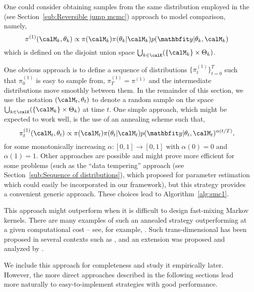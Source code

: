 One could consider obtaining samples from the same distribution employed in the \rjmcmc (see Section~\ref{sub:Reversible jump mcmc}) approach to model comparison, namely,
\begin{equation}
  \pi^{(1)}(\calM_k,\theta_k) \propto
  \pi(\calM_k)\pi(\theta_k|\calM_k)p(\data|\theta_k,\calM_k)
\end{equation}
which is defined on the disjoint union space
$\bigcup_{k\in\calK}(\{\calM_k\}\times\Theta_k)$.

One obvious \smc approach is to define a sequence of distributions $\{\pi_t^{(1)}\}_{t=0}^T$ such that $\pi^{(1)}_0$ is easy to sample from, $\pi_{T}^{(1)} = \pi^{(1)}$ and the intermediate distributions move smoothly between them. In the remainder of this section, we use the notation $(\calM_t,\theta_t)$ to denote a random sample on the space $\bigcup_{k\in\calK}(\{\calM_k\}\times\Theta_k)$ at time $t$. One simple approach, which might be expected to work well, is the use of an annealing scheme such that,
\begin{equation}
  \pi^{(1)}_t(\calM_t,\theta_t) \propto \pi(\calM_t)\pi(\theta_t|\calM_t)
  p(\data|\theta_t,\calM_t)^{\alpha(t/T)},
  \label{eq:geometry_1}
\end{equation}
for some monotonically increasing $\alpha:[0,1]\to[0,1]$ with $\alpha(0) = 0$ and $\alpha(1) = 1$. Other approaches are possible and might prove more efficient for some problems (such as the ``data tempering'' approach (see Section~\ref{sub:Sequence of distributions}), which \cite{Chopin:2002hg} proposed for parameter estimation which could easily be incorporated in our framework), but this strategy provides a convenient generic approach. These choices lead to Algorithm~\ref{alg:smc1}.



This approach might outperform \rjmcmc when it is difficult to design fast-mixing Markov kernels. There are many examples of such an annealed \smc strategy outperforming \mcmc at a given computational cost -- see, for example, \cite{Fan:2008tf,Johansen:2008kp,Fearnhead:2010ua}. Such trans-dimensional \smc has been proposed in several contexts such as \cite{Peters:2005wh}, and an extension was proposed and analyzed by \cite{Jasra:2008bb}.

We include this approach for completeness and study it empirically later. However, the more direct approaches described in the following sections lead more naturally to easy-to-implement strategies with good performance.

